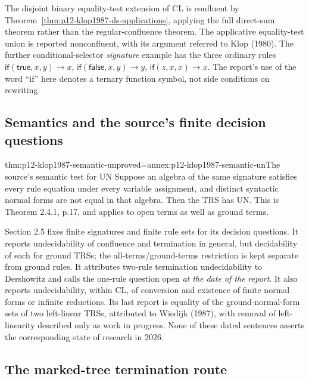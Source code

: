 The disjoint binary equality-test extension of CL is confluent by
Theorem~\ref{thm:p12-klop1987-ds-applications}, applying the full
direct-sum theorem rather than the regular-confluence theorem.
The applicative equality-test union is reported nonconfluent,
with its argument referred to Klop (1980). The further conditional-selector
\emph{signature} example has the three ordinary rules
\(\mathsf{if}(\mathsf{true},x,y)\to x\),
\(\mathsf{if}(\mathsf{false},x,y)\to y\),
\(\mathsf{if}(z,x,x)\to x\). The report's use of the word ``if''
here denotes a ternary function symbol, not side conditions on rewriting.



\subsection{Semantics and the source's finite decision questions}

\begin{hbtheorem}{thm:p12-klop1987-semantic-un}{proved=annex:p12-klop1987-semantic-un}{The source's semantic test for UN}
Suppose an algebra of the same signature satisfies every rule equation
under every variable assignment, and distinct syntactic normal forms are
not equal in that algebra. Then the TRS has UN. This is Theorem 2.4.1,
p.17, and applies to open terms as well as ground terms.
\end{hbtheorem}

Section 2.5 fixes finite signatures and finite rule sets for its decision
questions. It reports undecidability of confluence and termination in
general, but decidability of each for ground TRSs; the all-terms/ground-terms
restriction is kept separate from ground rules. It attributes two-rule
termination undecidability to Dershowitz and calls the one-rule question
open \emph{at the date of the report}. It also reports undecidability,
within CL, of conversion and existence of finite normal forms or infinite
reductions. Its last report is equality of the ground-normal-form sets of
two left-linear TRSs, attributed to Wiedijk (1987), with removal of
left-linearity described only as work in progress. None of these dated
sentences asserts the corresponding state of research in 2026.

\subsection{The marked-tree termination route}

